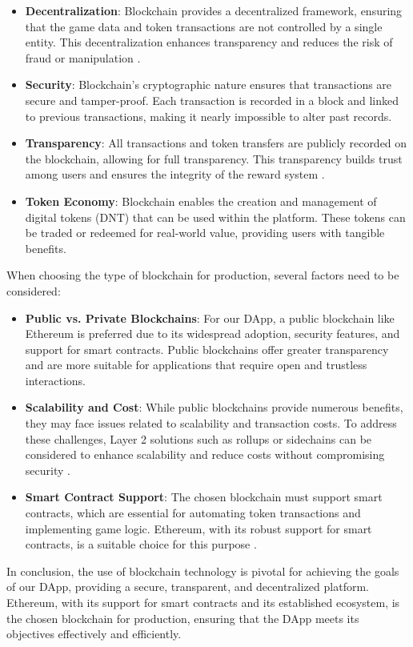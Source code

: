 \documentclass[../main.tex]{subfiles}
\begin{document}
\begin{itemize}
    \item \textbf{Decentralization}: Blockchain provides a decentralized framework, ensuring that the game data and token transactions are not controlled by a single entity. This decentralization enhances transparency and reduces the risk of fraud or manipulation \cite{EthereumGaming2023}.
    \item \textbf{Security}: Blockchain's cryptographic nature ensures that transactions are secure and tamper-proof. Each transaction is recorded in a block and linked to previous transactions, making it nearly impossible to alter past records.
    \item \textbf{Transparency}: All transactions and token transfers are publicly recorded on the blockchain, allowing for full transparency. This transparency builds trust among users and ensures the integrity of the reward system \cite{CoreDevsLtd2023}.
    \item \textbf{Token Economy}: Blockchain enables the creation and management of digital tokens (DNT) that can be used within the platform. These tokens can be traded or redeemed for real-world value, providing users with tangible benefits.
\end{itemize}

When choosing the type of blockchain for production, several factors need to be considered:

\begin{itemize}
    \item \textbf{Public vs. Private Blockchains}: For our DApp, a public blockchain like Ethereum is preferred due to its widespread adoption, security features, and support for smart contracts. Public blockchains offer greater transparency and are more suitable for applications that require open and trustless interactions.
    \item \textbf{Scalability and Cost}: While public blockchains provide numerous benefits, they may face issues related to scalability and transaction costs. To address these challenges, Layer 2 solutions such as rollups or sidechains can be considered to enhance scalability and reduce costs without compromising security \cite{EthereumGaming2023}.
    \item \textbf{Smart Contract Support}: The chosen blockchain must support smart contracts, which are essential for automating token transactions and implementing game logic. Ethereum, with its robust support for smart contracts, is a suitable choice for this purpose \cite{BlockchainGaming2021}.
\end{itemize}

In conclusion, the use of blockchain technology is pivotal for achieving the goals of our DApp, providing a secure, transparent, and decentralized platform. Ethereum, with its support for smart contracts and its established ecosystem, is the chosen blockchain for production, ensuring that the DApp meets its objectives effectively and efficiently.
\end{document}
